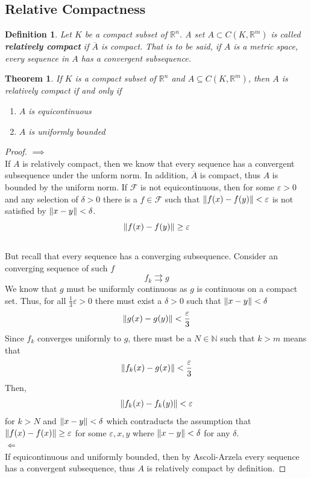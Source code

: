 \documentclass[a4paper, 12pt]{book}
\newtheorem{definition}{Definition}[chapter]
\newtheorem{theorem}{Theorem}[chapter]
\begin{document}
\subsection{Relative Compactness}
\begin{definition}
	Let \( K \) be a compact subset of \( \mathbb{R}^n \). A set \( A \subset C(K, \mathbb{R}^m) \) is called \textbf{relatively compact} if \( \overline{A} \) is compact. That is to be said, if \( A \) is a metric space, every sequence in \( A \) has a convergent subsequence.
\end{definition}
\begin{theorem}
	If \( K \) is a compact subset of \( \mathbb{R}^n \) and \( A\subseteq C(K, \mathbb{R}^m) \), then \( A \) is relatively compact if and only if
	\begin{enumerate}
		\item \( A \) is equicontinuous
		\item \( A \) is uniformly bounded
	\end{enumerate}
\end{theorem}
\begin{proof}
	\( \implies \)\\
	If \( A \) is relatively compact, then we know that every sequence has a convergent subsequence under the unform norm. In addition, \( \overline{A} \) is compact, thus \( A \) is bounded by the uniform norm. If \( \mathcal{F} \) is not equicontinuous, then for some \( \varepsilon>0 \) and any selection of \( \delta>0 \) there is a \( f \in \mathcal{F}\) such that \( \norm{f(x)-f(y)} <\varepsilon \) is not satisfied by \( \norm{x-y} <\delta \). \[
		\norm{f(x)-f(y)} \geq \varepsilon
	\]\\
	But recall that every sequence has a converging subsequence. Consider an converging sequence of such \( f \) \[
		f_k \rightrightarrows g
	\]
	We know that \( g \) must be uniformly continuous as \( g \) is continuous on a compact set. Thus, for all \( \frac{ 1 }{ 3 } \varepsilon>0 \) there must exist a \( \delta>0 \) such that \( \norm{x-y} <\delta \)\[
		\norm{g(x)-g(y)} <\frac{ \varepsilon }{ 3 }
	\]
	Since \( f_k \) converges uniformly to \( g \), there must be a \( N\in \mathbb{N}\) such that \( k>m \) means that \[
		\norm{f_k(x)-g(x)} <\frac{ \varepsilon }{ 3 }
	\]
	Then, \[
		\norm{f_k(x)-f_k(y)}<\varepsilon
	\]
	for \( k>N \) and \( \norm{x-y} <\delta \) which contraducts the assumption that \( \norm{f(x)-f(x)}\geq \varepsilon  \) for some \( \varepsilon, x,y \) where \( \norm{x-y} <\delta \) for any \( \delta \).
	\\
	\(\Leftarrow\)
	\\
	If equicontinuous and uniformly bounded, then by Ascoli-Arzela every sequence has a convergent subsequence, thus \( A \) is relatively compact by definition.
\end{proof}
\end{document}
